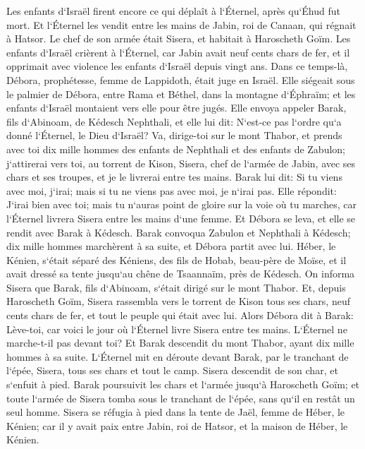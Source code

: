 \verse Les enfants d`Israël firent encore ce qui déplaît à l`Éternel, après qu`Éhud fut mort. 
\verse Et l`Éternel les vendit entre les mains de Jabin, roi de Canaan, qui régnait à Hatsor. Le chef de son armée était Sisera, et habitait à Haroscheth Goïm. 
\verse Les enfants d`Israël crièrent à l`Éternel, car Jabin avait neuf cents chars de fer, et il opprimait avec violence les enfants d`Israël depuis vingt ans. 
\verse Dans ce temps-là, Débora, prophétesse, femme de Lappidoth, était juge en Israël. 
\verse Elle siégeait sous le palmier de Débora, entre Rama et Béthel, dans la montagne d`Éphraïm; et les enfants d`Israël montaient vers elle pour être jugés. 
\verse Elle envoya appeler Barak, fils d`Abinoam, de Kédesch Nephthali, et elle lui dit: N`est-ce pas l`ordre qu`a donné l`Éternel, le Dieu d`Israël? Va, dirige-toi sur le mont Thabor, et prends avec toi dix mille hommes des enfants de Nephthali et des enfants de Zabulon; 
\verse j`attirerai vers toi, au torrent de Kison, Sisera, chef de l`armée de Jabin, avec ses chars et ses troupes, et je le livrerai entre tes mains. 
\verse Barak lui dit: Si tu viens avec moi, j`irai; mais si tu ne viens pas avec moi, je n`irai pas. 
\verse Elle répondit: J`irai bien avec toi; mais tu n`auras point de gloire sur la voie où tu marches, car l`Éternel livrera Sisera entre les mains d`une femme. Et Débora se leva, et elle se rendit avec Barak à Kédesch. 
\verse Barak convoqua Zabulon et Nephthali à Kédesch; dix mille hommes marchèrent à sa suite, et Débora partit avec lui. 
\verse Héber, le Kénien, s`était séparé des Kéniens, des fils de Hobab, beau-père de Moïse, et il avait dressé sa tente jusqu`au chêne de Tsaannaïm, près de Kédesch. 
\verse On informa Sisera que Barak, fils d`Abinoam, s`était dirigé sur le mont Thabor. 
\verse Et, depuis Haroscheth Goïm, Sisera rassembla vers le torrent de Kison tous ses chars, neuf cents chars de fer, et tout le peuple qui était avec lui. 
\verse Alors Débora dit à Barak: Lève-toi, car voici le jour où l`Éternel livre Sisera entre tes mains. L`Éternel ne marche-t-il pas devant toi? Et Barak descendit du mont Thabor, ayant dix mille hommes à sa suite. 
\verse L`Éternel mit en déroute devant Barak, par le tranchant de l`épée, Sisera, tous ses chars et tout le camp. Sisera descendit de son char, et s`enfuit à pied. 
\verse Barak poursuivit les chars et l`armée jusqu`à Haroscheth Goïm; et toute l`armée de Sisera tomba sous le tranchant de l`épée, sans qu`il en restât un seul homme. 
\verse Sisera se réfugia à pied dans la tente de Jaël, femme de Héber, le Kénien; car il y avait paix entre Jabin, roi de Hatsor, et la maison de Héber, le Kénien. 
